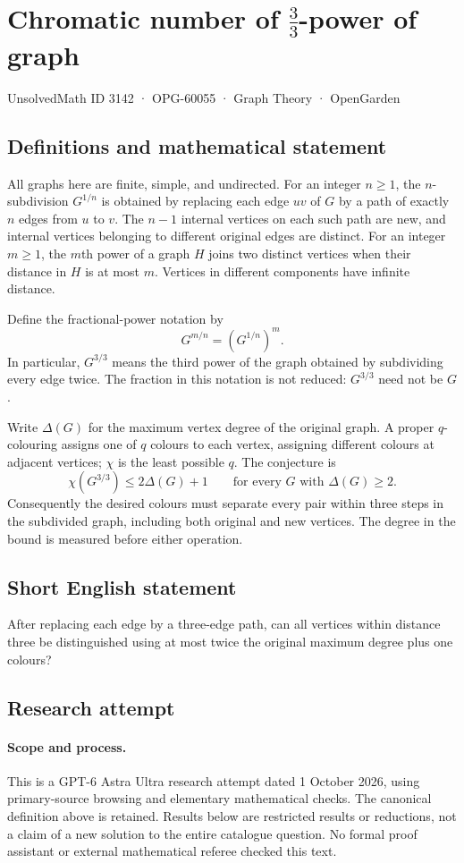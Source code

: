 \documentclass[11pt,a4paper]{article}
\begin{document}
\section*{Chromatic number of $\frac{3}{3}$-power of graph}\label{3142}
{\small UnsolvedMath ID 3142 · OPG-60055 · Graph Theory · OpenGarden}
\subsection{Definitions and mathematical statement}
All graphs here are finite, simple, and undirected. For an integer
$n\geq1$, the $n$-subdivision $G^{1/n}$ is obtained by replacing
each edge $uv$ of $G$ by a path of exactly $n$ edges from $u$ to
$v$. The $n-1$ internal vertices on each such path are new, and
internal vertices belonging to different original edges are
distinct. For an integer $m\geq1$, the $m$th power of a graph $H$
joins two distinct vertices when their distance in $H$ is at most
$m$. Vertices in different components have infinite distance.

Define the fractional-power notation by
\[
 G^{m/n}=(G^{1/n})^m.
\]
In particular, $G^{3/3}$ means the third power of the graph obtained
by subdividing every edge twice. The fraction in this notation is
not reduced: $G^{3/3}$ need not be $G$.

Write $\Delta(G)$ for the maximum vertex degree of the original
graph. A proper $q$-colouring assigns one of $q$ colours to each
vertex, assigning different colours at adjacent vertices; $\chi$
is the least possible $q$. The conjecture is
\[
 \chi(G^{3/3})\leq2\Delta(G)+1
 \qquad\text{for every }G\text{ with }\Delta(G)\geq2.
\]
Consequently the desired colours must separate every pair within
three steps in the subdivided graph, including both original and
new vertices. The degree in the bound is measured before either
operation.
\subsection{Short English statement}
After replacing each edge by a three-edge path, can all vertices within distance three be distinguished using at most twice the original maximum degree plus one colours?
\subsection{Research attempt}
\paragraph{Scope and process.}
This is a GPT-6 Astra Ultra research attempt dated 1 October 2026, using
primary-source browsing and elementary mathematical checks. The canonical
definition above is retained. Results below are restricted results or
reductions, not a claim of a new solution to the entire catalogue question.
No formal proof assistant or external mathematical referee checked this text.
\end{document}
